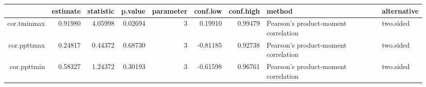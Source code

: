 \begin{table}[ht]
\centering
\begin{tabular}{rrrrrrrll}
  \hline
 & estimate & statistic & p.value & parameter & conf.low & conf.high & method & alternative \\ 
  \hline
cor.tminmax & 0.91980 & 4.05998 & 0.02694 &      3 & 0.19910 & 0.99479 & Pearson's product-moment correlation & two.sided \\ 
  cor.ppttmax & 0.24817 & 0.44372 & 0.68730 &      3 & -0.81185 & 0.92738 & Pearson's product-moment correlation & two.sided \\ 
  cor.ppttmin & 0.58327 & 1.24372 & 0.30193 &      3 & -0.61598 & 0.96761 & Pearson's product-moment correlation & two.sided \\ 
   \hline
\end{tabular}
\end{table}
